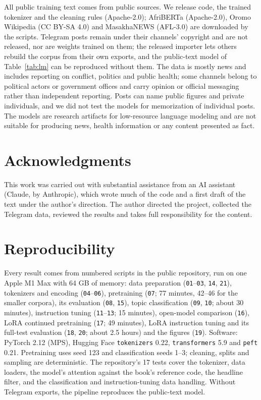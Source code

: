 \documentclass[11pt]{article}
\begin{document}
All public training text comes from public sources. We release code, the trained tokenizer and the cleaning rules (Apache-2.0); AfriBERTa (Apache-2.0), Oromo Wikipedia (CC BY-SA 4.0) and MasakhaNEWS (AFL-3.0) are downloaded by the scripts. Telegram posts remain under their channels' copyright and are not released, nor are weights trained on them; the released importer lets others rebuild the corpus from their own exports, and the public-text model of Table~\ref{tab:lm} can be reproduced without them. The data is mostly news and includes reporting on conflict, politics and public health; some channels belong to political actors or government offices and carry opinion or official messaging rather than independent reporting. Posts can name public figures and private individuals, and we did not test the models for memorization of individual posts. The models are research artifacts for low-resource language modeling and are not suitable for producing news, health information or any content presented as fact.

\section*{Acknowledgments}

This work was carried out with substantial assistance from an AI assistant (Claude, by Anthropic), which wrote much of the code and a first draft of the text under the author's direction. The author directed the project, collected the Telegram data, reviewed the results and takes full responsibility for the content.



\appendix

\section{Reproducibility}
\label{sec:repro}

Every result comes from numbered scripts in the public repository, run on one Apple M1 Max with 64 GB of memory: data preparation (\texttt{01}--\texttt{03}, \texttt{14}, \texttt{21}), tokenizers and encoding (\texttt{04}--\texttt{06}), pretraining (\texttt{07}; 77 minutes, 42--46 for the smaller corpora), its evaluation (\texttt{08}, \texttt{15}), topic classification (\texttt{09}, \texttt{10}; about 30 minutes), instruction tuning (\texttt{11}--\texttt{13}; 15 minutes), open-model comparison (\texttt{16}), LoRA continued pretraining (\texttt{17}; 49 minutes), LoRA instruction tuning and its full-test evaluation (\texttt{18}, \texttt{20}; about 2.5 hours) and the figures (\texttt{19}). Software: PyTorch 2.12 (MPS), Hugging Face \texttt{tokenizers} 0.22, \texttt{transformers} 5.9 and \texttt{peft} 0.21. Pretraining uses seed 123 and classification seeds 1--3; cleaning, splits and sampling are deterministic. The repository's 17 tests cover the tokenizer, data loaders, the model's attention against the book's reference code, the headline filter, and the classification and instruction-tuning data handling. Without Telegram exports, the pipeline reproduces the public-text model.
\end{document}

